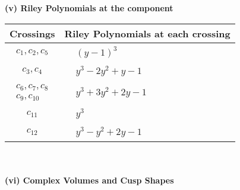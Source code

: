 \documentclass[1p]{elsarticle_modified}
\theoremstyle{definition}
\begin{document}
\newpage\renewcommand{\arraystretch}{1}
\flushleft \textbf{(v) Riley Polynomials at the component}\newline \\
\begin{tabular}{m{50pt}|m{274pt}}
Crossings & \hspace{64pt}Riley Polynomials at each crossing \\
\hline $$\begin{aligned}c_{1},c_{2},c_{5}\end{aligned}$$&$\begin{aligned}
&(y-1)^3
\end{aligned}$\\
\hline $$\begin{aligned}c_{3},c_{4}\end{aligned}$$&$\begin{aligned}
&y^3-2 y^2+y-1
\end{aligned}$\\
\hline $$\begin{aligned}c_{6},c_{7},c_{8}\\c_{9},c_{10}\end{aligned}$$&$\begin{aligned}
&y^3+3 y^2+2 y-1
\end{aligned}$\\
\hline $$\begin{aligned}c_{11}\end{aligned}$$&$\begin{aligned}
&y^3
\end{aligned}$\\
\hline $$\begin{aligned}c_{12}\end{aligned}$$&$\begin{aligned}
&y^3- y^2+2 y-1
\end{aligned}$\\
\hline
\end{tabular}\\~\\
\newpage\flushleft \textbf{(vi) Complex Volumes and Cusp Shapes}
\end{document}
